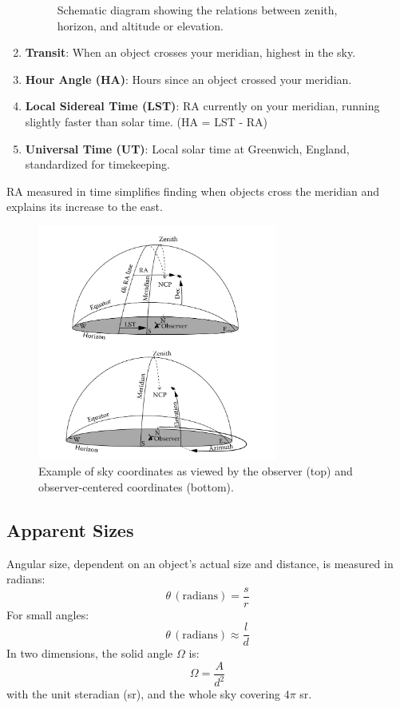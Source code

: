 \begin{enumerate}
\begin{figure}[H]
        \caption{Schematic diagram showing the relations between zenith, horizon, and altitude or elevation.}
        \label{fig:zenith_horizon_altitude_elevation}
    \end{figure}
    \item \textbf{Transit}: When an object crosses your meridian, highest in the sky.
    \item \textbf{Hour Angle (HA)}: Hours since an object crossed your meridian.
    \item \textbf{Local Sidereal Time (LST)}: RA currently on your meridian, running slightly faster than solar time. (HA = LST - RA)
    \item \textbf{Universal Time (UT)}: Local solar time at Greenwich, England, standardized for timekeeping.
\end{enumerate}

RA measured in time simplifies finding when objects cross the meridian and explains its increase to the east.

\begin{figure}[H]
    \centering
    \includegraphics[width=0.7\textwidth]{Images/sky_coordinates_example.png}
    \caption{Example of sky coordinates as viewed by the observer (top) and observer-centered coordinates (bottom).}
    \label{fig:sky_coordinates_example}
\end{figure}

\subsection{Apparent Sizes}
Angular size, dependent on an object's actual size and distance, is measured in radians:
\[
\theta \, (\text{radians}) = \frac{s}{r}
\]
For small angles:
\[
\theta \, (\text{radians}) \approx \frac{l}{d}
\]
In two dimensions, the solid angle $\Omega$ is:
\[
\Omega = \frac{A}{d^2}
\]
with the unit steradian (sr), and the whole sky covering $4\pi$ sr.


